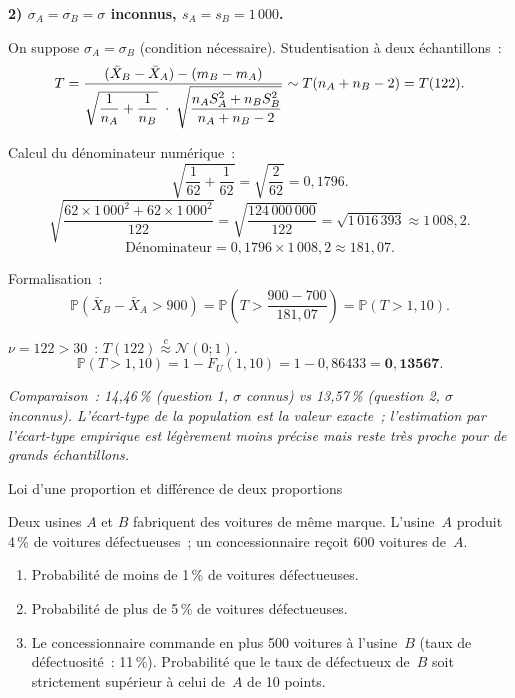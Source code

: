 \documentclass[11pt,a4paper]{article}
\newcommand{\N}{\mathcal{N}}
\newcommand{\Prob}{\mathbb{P}}
\newcommand{\appN}{\overset{c}{\approx}}
\renewcommand{\P}{\Prob}
\begin{document}
\medskip
\textbf{2) $\sigma_A=\sigma_B=\sigma$ inconnus, $s_A=s_B=1\,000$.}

On suppose $\sigma_A=\sigma_B$ (condition n\'ecessaire). Studentisation \`a deux \'echantillons~:
$$T = \frac{(\bar{X}_B-\bar{X}_A)-(m_B-m_A)}{%
  \sqrt{\dfrac{1}{n_A}+\dfrac{1}{n_B}}\;\cdot\;
  \sqrt{\dfrac{n_AS_A^2+n_BS_B^2}{n_A+n_B-2}}} \sim T(n_A+n_B-2)=T(122).$$

Calcul du d\'enominateur num\'erique~:
$$\sqrt{\frac{1}{62}+\frac{1}{62}} = \sqrt{\frac{2}{62}} = 0{,}1796.$$
$$\sqrt{\frac{62\times1\,000^2+62\times1\,000^2}{122}} = \sqrt{\frac{124\,000\,000}{122}} = \sqrt{1\,016\,393} \approx 1\,008{,}2.$$
$$\text{D\'enominateur} = 0{,}1796 \times 1\,008{,}2 \approx 181{,}07.$$

Formalisation~:
$$\P(\bar{X}_B-\bar{X}_A>900) = \P\!\left(T > \frac{900-700}{181{,}07}\right) = \P(T>1{,}10).$$

\begin{methbox}[Convergence]
$\nu = 122 > 30$~: $T(122)\appN\N(0;1)$.
$$\P(T>1{,}10) = 1-F_U(1{,}10) = 1-0{,}86433 = \mathbf{0{,}13567}.$$
\end{methbox}

\textit{Comparaison~: 14,46\,\% (question 1, $\sigma$ connus) vs 13,57\,\% (question 2, $\sigma$ inconnus). L'\'ecart-type de la population est la valeur exacte~; l'estimation par l'\'ecart-type empirique est l\'eg\`erement moins pr\'ecise mais reste tr\`es proche pour de grands \'echantillons.}

\begin{exercice}{Loi d'une proportion et diff\'erence de deux proportions}

Deux usines $A$ et $B$ fabriquent des voitures de m\^eme marque. L'usine~$A$ produit 4\,\% de voitures d\'efectueuses~; un concessionnaire re\c{c}oit 600 voitures de~$A$.
\begin{enumerate}[label=\textbf{\arabic*)}]
  \item Probabilit\'e de moins de 1\,\% de voitures d\'efectueuses.
  \item Probabilit\'e de plus de 5\,\% de voitures d\'efectueuses.
  \item Le concessionnaire commande en plus 500 voitures \`a l'usine~$B$ (taux de d\'efectuosit\'e~: 11\,\%). Probabilit\'e que le taux de d\'efectueux de~$B$ soit strictement sup\'erieur \`a celui de~$A$ de 10 points.
\end{enumerate}
\end{exercice}
\end{document}
